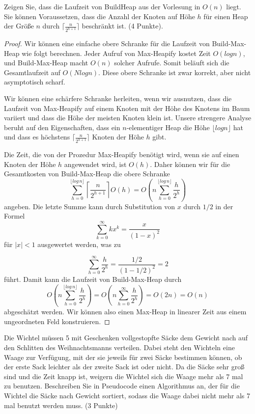 \documentclass[ngerman,landscape,twocolumn]{adtexsheet}
\begin{document}
\begin{question}
Zeigen Sie, dass die Laufzeit von BuildHeap aus der Vorlesung in $O(n)$ liegt. Sie können Voraussetzen, dass die Anzahl der Knoten auf Höhe $h$ für einen Heap der Größe $n$ durch $\lceil \frac{n}{2^{h+1}} \rceil$ beschränkt ist. (4 Punkte).
\end{question}
    \begin{proof}
    Wir können eine einfache obere Schranke für die Laufzeit von Build-Max-Heap wie folgt berechnen. Jeder Aufruf von Max-Heapify kostet Zeit $O(log n)$, und Build-Max-Heap macht $O(n)$ solcher Aufrufe. Somit beläuft sich die Gesamtlaufzeit auf $O(N log n)$. Diese obere Schranke ist zwar korrekt, aber nicht asymptotisch scharf.
    
    Wir können eine schärfere Schranke herleiten, wenn wir ausnutzen, dass die Laufzeit von Max-Heapify auf einem Knoten mit der Höhe des Knotens im Baum variiert und dass die Höhe der meisten Knoten klein ist. Unsere strengere Analyse beruht auf den Eigenschaften, dass ein $n$-elementiger Heap die Höhe $\lfloor log n \rfloor$ hat und dass es höchstens $\lceil \frac{n}{2^{h+1}} \rceil$ Knoten der Höhe $h$ gibt.
    
    Die Zeit, die von der Prozedur Max-Heapify benötigt wird, wenn sie auf einen Knoten der Höhe $h$ angewendet wird, ist $O(h)$. Daher können wir für die Gesamtkosten von Build-Max-Heap die obere Schranke
    \[
    \sum_{h=0}^{\lfloor log\,n \rfloor} \left\lceil \frac{n}{2^{h+1}} \right\rceil O(h) = O\left( n \sum_{h=0}^{\lfloor log\,n \rfloor} \frac{h}{2^h} \right)
    \]
    angeben. Die letzte Summe kann durch Substitution von $x$ durch $1/2$ in der Formel
    \[
    \sum_{k=0}^{\infty} kx^k= \frac{x}{(1-x)^2}
    \]
    für $|x| < 1$ ausgewertet werden, was zu
    
    \[
    \sum_{h=0}^{\infty} \frac{h}{2^h} = \frac{1/2}{(1-1/2)^2} = 2
    \]
    führt. Damit kann die Laufzeit von Build-Max-Heap durch
    \[
    O \left( n \sum_{h=0}^{\lfloor log\,n \rfloor} \frac{h}{2^h}  \right) = O \left( n \sum_{h=0}^{\infty} \frac{h}{2^h}  \right) = O(2n) = O(n)
    \]
    abgeschätzt werden. Wir können also einen Max-Heap in linearer Zeit aus einem ungeordneten Feld konstruieren.
\end{proof}

\newpage
\begin{question}
Die Wichtel müssen 5 mit Geschenken vollgestopfte Säcke dem Gewicht nach auf den
Schlitten des Weihnachtsmanns verteilen. Dabei steht den Wichteln eine Waage zur
Verfügung, mit der sie jeweils für zwei Säcke bestimmen können, ob der erste Sack leichter
als der zweite Sack ist oder nicht. Da die Säcke sehr groß sind und die Zeit knapp ist,
weigern die Wichtel sich die Waage mehr als 7 mal zu benutzen. Beschreiben Sie in
Pseudocode einen Algorithmus an, der für die Wichtel die Säcke nach Gewicht sortiert,
sodass die Waage dabei nicht mehr als 7 mal benutzt werden muss. (3 Punkte)
\end{question}
\end{document}
